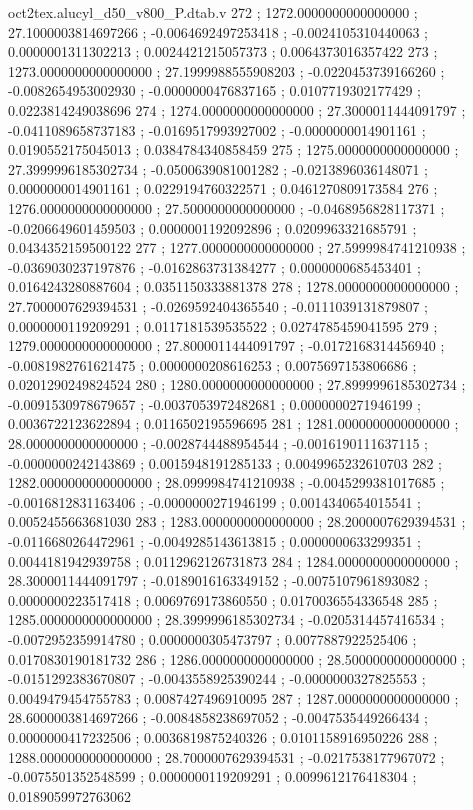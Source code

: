 \begin{filecontents}[overwrite]{oct2tex.alucyl_d50_v800_P.dtab.v}
272 ; 1272.0000000000000000 ; 27.1000003814697266 ; -0.0064692497253418 ; -0.0024105310440063 ; 0.0000001311302213 ; 0.0024421215057373 ; 0.0064373016357422
273 ; 1273.0000000000000000 ; 27.1999988555908203 ; -0.0220453739166260 ; -0.0082654953002930 ; -0.0000000476837165 ; 0.0107719302177429 ; 0.0223814249038696
274 ; 1274.0000000000000000 ; 27.3000011444091797 ; -0.0411089658737183 ; -0.0169517993927002 ; -0.0000000014901161 ; 0.0190552175045013 ; 0.0384784340858459
275 ; 1275.0000000000000000 ; 27.3999996185302734 ; -0.0500639081001282 ; -0.0213896036148071 ; 0.0000000014901161 ; 0.0229194760322571 ; 0.0461270809173584
276 ; 1276.0000000000000000 ; 27.5000000000000000 ; -0.0468956828117371 ; -0.0206649601459503 ; 0.0000001192092896 ; 0.0209963321685791 ; 0.0434352159500122
277 ; 1277.0000000000000000 ; 27.5999984741210938 ; -0.0369030237197876 ; -0.0162863731384277 ; 0.0000000685453401 ; 0.0164243280887604 ; 0.0351150333881378
278 ; 1278.0000000000000000 ; 27.7000007629394531 ; -0.0269592404365540 ; -0.0111039131879807 ; 0.0000000119209291 ; 0.0117181539535522 ; 0.0274785459041595
279 ; 1279.0000000000000000 ; 27.8000011444091797 ; -0.0172168314456940 ; -0.0081982761621475 ; 0.0000000208616253 ; 0.0075697153806686 ; 0.0201290249824524
280 ; 1280.0000000000000000 ; 27.8999996185302734 ; -0.0091530978679657 ; -0.0037053972482681 ; 0.0000000271946199 ; 0.0036722123622894 ; 0.0116502195596695
281 ; 1281.0000000000000000 ; 28.0000000000000000 ; -0.0028744488954544 ; -0.0016190111637115 ; -0.0000000242143869 ; 0.0015948191285133 ; 0.0049965232610703
282 ; 1282.0000000000000000 ; 28.0999984741210938 ; -0.0045299381017685 ; -0.0016812831163406 ; -0.0000000271946199 ; 0.0014340654015541 ; 0.0052455663681030
283 ; 1283.0000000000000000 ; 28.2000007629394531 ; -0.0116680264472961 ; -0.0049285143613815 ; 0.0000000633299351 ; 0.0044181942939758 ; 0.0112962126731873
284 ; 1284.0000000000000000 ; 28.3000011444091797 ; -0.0189016163349152 ; -0.0075107961893082 ; 0.0000000223517418 ; 0.0069769173860550 ; 0.0170036554336548
285 ; 1285.0000000000000000 ; 28.3999996185302734 ; -0.0205314457416534 ; -0.0072952359914780 ; 0.0000000305473797 ; 0.0077887922525406 ; 0.0170830190181732
286 ; 1286.0000000000000000 ; 28.5000000000000000 ; -0.0151292383670807 ; -0.0043558925390244 ; -0.0000000327825553 ; 0.0049479454755783 ; 0.0087427496910095
287 ; 1287.0000000000000000 ; 28.6000003814697266 ; -0.0084858238697052 ; -0.0047535449266434 ; 0.0000000417232506 ; 0.0036819875240326 ; 0.0101158916950226
288 ; 1288.0000000000000000 ; 28.7000007629394531 ; -0.0217538177967072 ; -0.0075501352548599 ; 0.0000000119209291 ; 0.0099612176418304 ; 0.0189059972763062

\end{filecontents}
